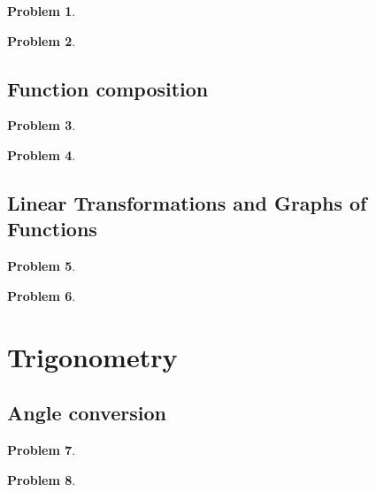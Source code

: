 \documentclass{article}
\newtheorem{problem}{Problem}
\begin{document}
\begin{problem}
\item 
\end{problem}

\begin{problem}

\end{problem}

\subsection{Function composition}
\begin{problem}

\end{problem}
\begin{problem}

\end{problem}
\subsection{Linear Transformations and Graphs of Functions}
\begin{problem}

\end{problem}

\begin{problem}

\end{problem}



\section{Trigonometry}\label{secMPStrigonometry}
\subsection{Angle conversion}
\begin{problem}

\end{problem}
\begin{problem}

\end{problem}
\end{document}

